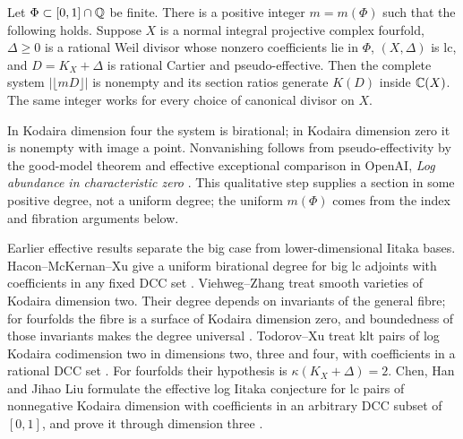 \begin{theorem}
\label{thm:main}
Let $\Phi\subset[0,1]\cap\mathbb Q$ be finite. There is a positive integer
$m=m(\Phi)$ such that the following holds. Suppose $X$ is a normal
integral projective complex fourfold, $\Delta\geq0$ is a rational
Weil divisor whose nonzero coefficients lie in $\Phi$, $(X,\Delta)$
is lc, and $D=K_X+\Delta$ is rational Cartier and pseudo-effective.
Then the complete system $|\lfloor mD\rfloor|$ is nonempty and its
section ratios generate $K(D)$ inside $\mathbb C(X)$. The same integer works
for every choice of canonical divisor on $X$.
\end{theorem}

In Kodaira dimension four the system is birational; in Kodaira
dimension zero it is nonempty with image a point. Nonvanishing follows
from pseudo-effectivity by the good-model theorem and effective
exceptional comparison in OpenAI, \emph{Log abundance in characteristic
zero} \cite[Theorems~1.1 and~11.1, Lemma~2.2]{OpenAIAbundance}.
This qualitative step supplies a section in some positive degree,
not a uniform degree; the uniform $m(\Phi)$ comes from the index and
fibration arguments below.

Earlier effective results separate the big case from lower-dimensional
Iitaka bases. Hacon--McKernan--Xu give a uniform birational degree
for big lc adjoints with coefficients in any fixed DCC set
\cite[Theorem~1.3]{HMX2014}. Viehweg--Zhang treat smooth varieties
of Kodaira dimension two. Their degree depends on invariants of
the general fibre; for fourfolds the fibre is a surface of Kodaira
dimension zero, and boundedness of those invariants makes the degree
universal \cite[Theorem~0.2 and the discussion preceding Corollary~0.4]{ViehwegZhang2009}.
Todorov--Xu treat klt pairs of log Kodaira codimension two in
dimensions two, three and four, with coefficients in a rational DCC set
\cite[Theorem~1.2]{TodorovXu2009}. For fourfolds their hypothesis is
$\kappa(K_X+\Delta)=2$. Chen, Han and Jihao Liu formulate the
effective log Iitaka conjecture for lc pairs of nonnegative Kodaira
dimension with coefficients in an arbitrary DCC subset of $[0,1]$,
and prove it through dimension three
\cite[Conjecture~1.2 and Corollary~1.5]{ChenHanLiu2023}.

